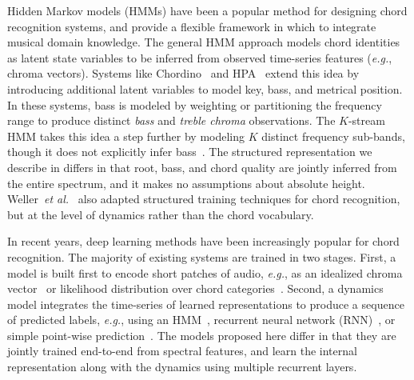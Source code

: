 \documentclass{article}
\def\eg{\emph{e.g.}}
\def\etal{\emph{et al.}}
\begin{document}
Hidden Markov models (HMMs) have been a popular method for designing chord recognition systems, and provide a flexible framework in which to integrate musical domain knowledge.
The general HMM approach models chord identities as latent state variables to be inferred from observed time-series features (\eg, chroma vectors).
Systems like Chordino~\cite{matthias2010a} and HPA~\cite{ni2012end} extend this idea by introducing additional latent variables to model key, bass, and metrical position.
In these systems, bass is modeled by weighting or partitioning the frequency range to produce distinct \emph{bass} and \emph{treble chroma} observations.
The $K$-stream HMM takes this idea a step further by modeling $K$ distinct frequency sub-bands, though it does not explicitly infer bass~\cite{cho2014improved}.
The structured representation we describe in  differs in that root, bass, and chord quality are jointly inferred from the entire spectrum, and it makes no assumptions about absolute height.
Weller~\etal~\cite{weller2009structured} also adapted structured training techniques for chord recognition, but at the level of dynamics rather than the chord vocabulary.



%   

In recent years, deep learning methods have been increasingly popular for chord recognition.
The majority of existing systems are trained in two stages. 
First, a model is built first to encode short patches of audio, \eg, as an idealized chroma vector~\cite{boulanger2013audio,korzeniowski2016feature} or likelihood distribution over chord categories~\cite{humphrey2015four,sigtia2015audio,zhou2015chord,deng2016hybrid}.
Second, a dynamics model integrates the time-series of learned representations to produce a sequence of predicted labels, \eg, using an HMM~\cite{humphrey2015four,zhou2015chord}, recurrent neural network (RNN)~\cite{boulanger2013audio,sigtia2015audio}, or simple point-wise prediction~\cite{korzeniowski2016feature}.
The models proposed here differ in that they are jointly trained end-to-end from spectral features, and learn the internal representation along with the dynamics using multiple recurrent layers.
\end{document}

